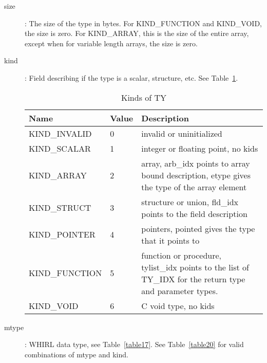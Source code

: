 \begin{description}
\item[size]: The size of the type in bytes. For
%
KIND\_FUNCTION and
KIND\_VOID, the size is zero. For KIND\_ARRAY, this is the size of the
entire array, except when for variable length arrays, the size is
zero. 

\item[kind]: Field describing if the type is a scalar, structure,
  etc. See Table~\ref{table16}.

\begin{table}[h]
\centering
\caption{Kinds of TY} 
\label{table16} 
\begin{tabular}{|l|l|p{3in}|}\hline
Name & Value & Description\\\hline\hline
\index{KIND\_INVALID}%
KIND\_INVALID & 0 & invalid or uninitialized\\\hline
\index{KIND\_SCALAR}%
KIND\_SCALAR & 1 & integer or floating point, no kids \\\hline
\index{KIND\_ARRAY}%
KIND\_ARRAY & 2 & array, arb\_idx points to array bound description,
etype gives the type of the array element\\\hline
\index{KIND\_STRUCT}%
KIND\_STRUCT & 3 & structure or union, fld\_idx points to the field
description\\\hline 
\index{KIND\_POINTER}%
KIND\_POINTER & 4 & pointers, pointed gives the type that
it points to \\\hline
\index{KIND\_FUNCTION}%
KIND\_FUNCTION & 5 & function or procedure, tylist\_idx points to the list of
\index{TY\_IDX}%
TY\_IDX for the return type and parameter types.\\\hline
\index{KIND\_VOID}%
KIND\_VOID & 6 & C void type, no kids\\\hline
\end{tabular}
\end{table}

\item[mtype]: WHIRL data type, see Table~\ref{table17}. See
  Table~\ref{table20} for valid combinations of mtype and kind.



\end{description}
